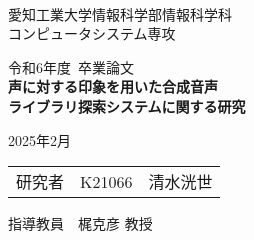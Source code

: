 \begin{titlepage}

\ \\
\begin{center}

{\LARGE 愛知工業大学情報科学部情報科学科\\
コンピュータシステム専攻

\vspace{1.0cm}

令和6年度~卒業論文\\

\vspace{2.0cm}
{\Huge
\baselineskip=15mm
\textbf{声に対する印象を用いた合成音声\\
ライブラリ探索システムに関する研究\\}}

\vspace{7.0cm}

2025年2月\\

\vspace{1.0cm}

\begin{tabular}[h]{lll}
  研究者  & K21066 & 清水洸世\\
\end{tabular}

\vspace{1.0cm}

指導教員\ \ 梶克彦 教授}

\end{center}

\end{titlepage}

